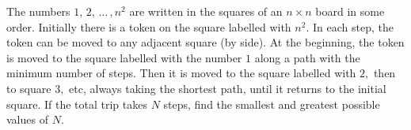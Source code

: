 The numbers $1,\, 2,\, \ldots\, , n^{2}$ are written in the squares of an $n \times n$ board in some order. Initially there is a token on the square labelled with $n^{2}.$ In each step, the token can be moved to any adjacent square (by side). At the beginning, the token is moved to the square labelled with the number $1$ along a path with the minimum number of steps. Then it is moved to the square labelled with $2,$ then to square $3,$ etc, always taking the shortest path, until it returns to the initial square. If the total trip takes $N$ steps, find the smallest and greatest possible values of $N.$